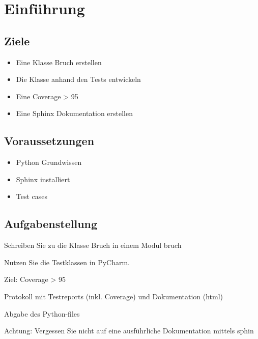 
\section{Einführung}
\subsection{Ziele}
\begin{itemize}
	\item Eine Klasse Bruch erstellen
	\item Die Klasse anhand den Tests entwickeln
	\item Eine Coverage > 95%
	\item Eine Sphinx Dokumentation erstellen
\end{itemize}


\subsection{Voraussetzungen}
\begin{itemize}
	\item Python Grundwissen
	\item Sphinx installiert
	\item Test cases
\end{itemize}

\subsection{Aufgabenstellung}
Schreiben Sie zu die Klasse Bruch in einem Modul bruch

Nutzen Sie die Testklassen  in PyCharm.

Ziel: Coverage > 95%

Protokoll mit Testreports (inkl. Coverage) und Dokumentation (html)

Abgabe des Python-files

Achtung: Vergessen Sie nicht auf eine ausführliche Dokumentation mittels sphin
\clearpage
